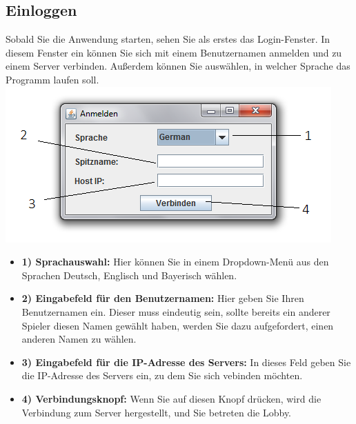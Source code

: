 \documentclass[titlepage,10pt,a4paper]{article}
\begin{document}
\subsection{Einloggen}
Sobald Sie die Anwendung starten, sehen Sie als erstes das Login-Fenster. In diesem Fenster ein können Sie sich mit einem Benutzernamen anmelden und zu einem \gls{Server} verbinden. Außerdem können Sie auswählen, in welcher Sprache das Programm laufen soll.\\
\includegraphics[width=\textwidth]{Login-Fenster}
\begin{itemize}
	\item \textbf{1) Sprachauswahl:} Hier können Sie in einem Dropdown-Menü aus den Sprachen Deutsch, Englisch und Bayerisch wählen.
	\item \textbf{2) Eingabefeld für den Benutzernamen:} Hier geben Sie Ihren Benutzernamen ein. Dieser muss eindeutig sein, sollte bereits ein anderer Spieler diesen Namen gewählt haben, werden Sie dazu aufgefordert, einen anderen Namen zu wählen.
	\item \textbf{3) Eingabefeld für die \gls{IP-Adresse} des \gls{Server}s:} In dieses Feld geben Sie die \gls{IP-Adresse} des \gls{Server}s ein, zu dem Sie sich vebinden möchten.
	\item \textbf{4) Verbindungsknopf:} Wenn Sie auf diesen Knopf drücken, wird die Verbindung zum \gls{Server} hergestellt, und Sie betreten die \gls{Lobby}.
\end{itemize}
\end{document}
